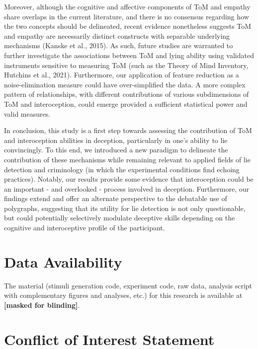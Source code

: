 \documentclass[
  man,mask,floatsintext]{apa6}
\begin{document}
Moreover, although the cognitive and affective components of ToM and empathy share overlaps in the current literature, and there is no consensus regarding how the two concepts should be delineated, recent evidence nonetheless suggests ToM and empathy are necessarily distinct constructs with separable underlying mechanisms (Kanske et al., 2015). As such, future studies are warranted to further investigate the associations between ToM and lying ability using validated instruments sensitive to measuring ToM (such as the Theory of Mind Inventory, Hutchins et al., 2021). Furthermore, our application of feature reduction as a noise-elimination measure could have over-simplified the data. A more complex pattern of relationships, with different contributions of various subdimensions of ToM and interoception, could emerge provided a sufficient statistical power and valid measures.

In conclusion, this study is a first step towards assessing the contribution of ToM and interoception abilities in deception, particularly in one's ability to lie convincingly. To this end, we introduced a new paradigm to delineate the contribution of these mechanisms while remaining relevant to applied fields of lie detection and criminology (in which the experimental conditions find echoing practices). Notably, our results provide some evidence that interoception could be an important - and overlooked - process involved in deception. Furthermore, our findings extend and offer an alternate perspective to the debatable use of polygraphs, suggesting that its utility for lie detection is not only questionable, but could potentially selectively modulate deceptive skills depending on the cognitive and interoceptive profile of the participant.

\hypertarget{data-availability}{%
\section{Data Availability}\label{data-availability}}

The material (stimuli generation code, experiment code, raw data, analysis script with complementary figures and analyses, etc.) for this research is available at
\textbf{{[}masked for blinding{]}}.

\hypertarget{conflict-of-interest-statement}{%
\section{Conflict of Interest Statement}\label{conflict-of-interest-statement}}
\end{document}
